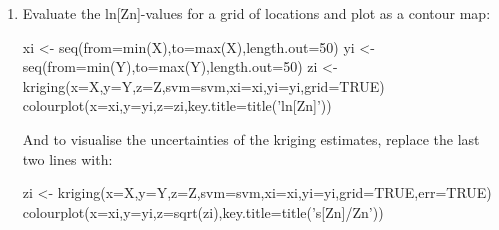 \begin{enumerate}
\item\label{it:R-meuse-contour} Evaluate the ln[Zn]-values for a grid
  of locations and plot as a contour map:

\begin{script}[firstnumber=7]
xi <- seq(from=min(X),to=max(X),length.out=50)
yi <- seq(from=min(Y),to=max(Y),length.out=50)
zi <- kriging(x=X,y=Y,z=Z,svm=svm,xi=xi,yi=yi,grid=TRUE)
colourplot(x=xi,y=yi,z=zi,key.title=title('ln[Zn]'))
\end{script}

And to visualise the uncertainties of the kriging estimates,
replace the last two lines with:

\begin{script}[firstnumber=9]
zi <- kriging(x=X,y=Y,z=Z,svm=svm,xi=xi,yi=yi,grid=TRUE,err=TRUE)
colourplot(x=xi,y=yi,z=sqrt(zi),key.title=title('s[Zn]/Zn'))
\end{script}

\end{enumerate}
